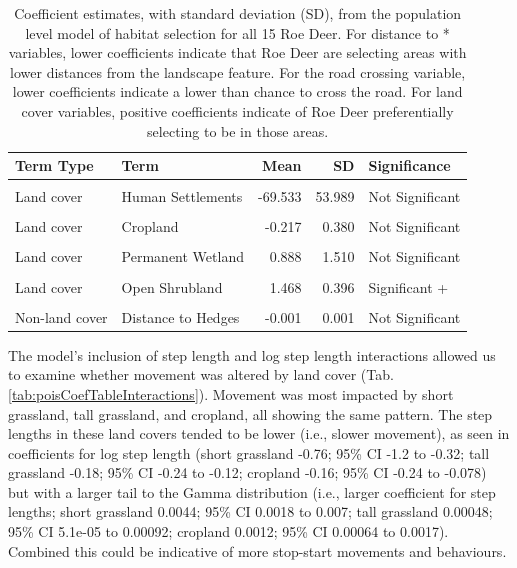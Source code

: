 \documentclass[10pt,a4paper]{article}
\begin{document}
\begin{longtable}[t]{llrrl}
\caption{\label{tab:poisCoefTable}Coefficient estimates, with standard deviation (SD), from the population level model of habitat selection for all 15 Roe Deer. For distance to * variables, lower coefficients indicate that Roe Deer are selecting areas with lower distances from the landscape feature. For the road crossing variable, lower coefficients indicate a lower than chance to cross the road. For land cover variables, positive coefficients indicate of Roe Deer preferentially selecting to be in those areas.}\\
\toprule
Term Type & Term & Mean & SD & Significance\\
\midrule
\cellcolor{gray!10}{Road Crossing} & \cellcolor{gray!10}{Road Crossing} & \cellcolor{gray!10}{-0.762} & \cellcolor{gray!10}{0.205} & \cellcolor{gray!10}{Significant -}\\
Land cover & Human Settlements & -69.533 & 53.989 & Not Significant\\
\cellcolor{gray!10}{Land cover} & \cellcolor{gray!10}{Evergreen Needleleaf Forest} & \cellcolor{gray!10}{-0.375} & \cellcolor{gray!10}{0.319} & \cellcolor{gray!10}{Not Significant}\\
Land cover & Cropland & -0.217 & 0.380 & Not Significant\\
\cellcolor{gray!10}{Land cover} & \cellcolor{gray!10}{Tall Grassland} & \cellcolor{gray!10}{0.566} & \cellcolor{gray!10}{0.208} & \cellcolor{gray!10}{Significant +}\\
\addlinespace
Land cover & Permanent Wetland & 0.888 & 1.510 & Not Significant\\
\cellcolor{gray!10}{Land cover} & \cellcolor{gray!10}{Short Grassland} & \cellcolor{gray!10}{1.431} & \cellcolor{gray!10}{1.220} & \cellcolor{gray!10}{Not Significant}\\
Land cover & Open Shrubland & 1.468 & 0.396 & Significant +\\
\cellcolor{gray!10}{Non-land cover} & \cellcolor{gray!10}{Distance to Woodland} & \cellcolor{gray!10}{-0.005} & \cellcolor{gray!10}{0.001} & \cellcolor{gray!10}{Significant -}\\
Non-land cover & Distance to Hedges & -0.001 & 0.001 & Not Significant\\
\bottomrule
\end{longtable}
\endgroup{}

The model's inclusion of step length and log step length interactions allowed us to examine whether movement was altered by land cover (Tab. \ref{tab:poisCoefTableInteractions}).
Movement was most impacted by short grassland, tall grassland, and cropland, all showing the same pattern.
The step lengths in these land covers tended to be lower (i.e., slower movement), as seen in coefficients for log step length (short grassland -0.76; 95\% CI -1.2 to -0.32; tall grassland -0.18; 95\% CI -0.24 to -0.12; cropland -0.16; 95\% CI -0.24 to -0.078) but with a larger tail to the Gamma distribution (i.e., larger coefficient for step lengths; short grassland 0.0044; 95\% CI 0.0018 to 0.007; tall grassland 0.00048; 95\% CI 5.1e-05 to 0.00092; cropland 0.0012; 95\% CI 0.00064 to 0.0017).
Combined this could be indicative of more stop-start movements and behaviours.
\end{document}
